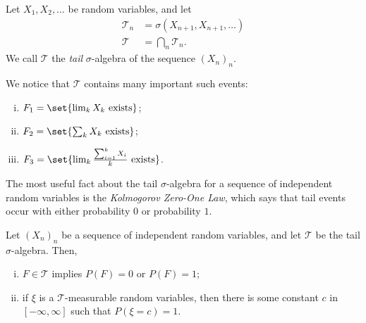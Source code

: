 \documentclass[10pt]{mypackage}
\begin{document}
\begin{definition}
  Let $X_1,X_2,\dots$ be random variables, and let
  \begin{align*}
    \mathcal{T}_n &= \sigma\left( X_{n+1},X_{n+1},\dots \right)\\
    \mathcal{T} &= \bigcap_{n} \mathcal{T}_n.
  \end{align*}
  We call $\mathcal{T}$ the \textit{tail} $\sigma$-algebra of the sequence $\left( X_n \right)_n$.
\end{definition}
We notice that $\mathcal{T}$ contains many important such events:
\begin{enumerate}[(i)]
  \item $F_1 = \set{\lim_{k}X_k\text{ exists}}$;
  \item $F_2 = \set{\sum_{k}X_k\text{ exists}}$;
  \item $F_3 = \set{\lim_{k}\frac{\sum_{i=1}^{k}X_i}{k}\text{ exists}}$.
\end{enumerate}
The most useful fact about the tail $\sigma$-algebra for a sequence of independent random variables is the \textit{Kolmogorov Zero-One Law}, which says that tail events occur with either probability $0$ or probability $1$.
\begin{theorem}
  Let $\left( X_n \right)_n$ be a sequence of independent random variables, and let $\mathcal{T}$ be the tail $\sigma$-algebra. Then,
  \begin{enumerate}[(i)]
    \item $F\in \mathcal{T}$ implies $P(F) = 0$ or $P(F) = 1$;
    \item if $\xi$ is a $\mathcal{T}$-measurable random variables, then there is some constant $c$ in $[-\infty,\infty]$ such that $P(\xi = c) = 1$.
  \end{enumerate}
\end{theorem}
\end{document}
